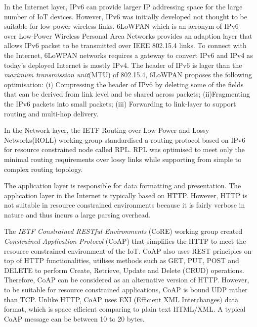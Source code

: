 In the Internet layer, IPv6 can provide larger IP addressing space for the large number of IoT devices. 
However, IPv6 was initially developed not thought to be suitable for low-power wireless links.
6LoWPAN which is an acronym of IPv6 over Low-Power Wireless Personal Area Networks provides an adaption layer that allows IPv6 packet to be transmitted over IEEE 802.15.4 links.
To connect with the Internet, 6LoWPAN networks requires a gateway to convert IPv6 and IPv4 as today’s deployed Internet is mostly IPv4. 
The header of IPv6 is lager than the \textit{maximum transmission unit}(MTU) of 802.15.4, 6LoWPAN proposes the following optimisation:
(i) Compressing the header of IPv6 by deleting some of the fields that can be derived from link level and be shared across packets;
(ii)Fragmenting the IPv6 packets into small packets;
(iii) Forwarding to link-layer to support routing and multi-hop delivery.

In the Network layer, the IETF Routing over Low Power and Lossy Networks(ROLL) working group standardised a routing protocol based on IPv6 for resource constrained node called RPL.
RPL was optimised to meet only the minimal routing requirements over lossy links while supporting from simple to complex routing topology.


The application layer is responsible for data formatting and presentation.
The application layer in the Internet is typically based on HTTP. 
However, HTTP is not suitable in resource constrained environments because it is fairly verbose in nature and thus incurs a large parsing overhead.


The \textit{IETF Constrained RESTful Environments} (CoRE) working group created \textit{Constrained Application Protocol} (CoAP) that simplifies the HTTP to meet the resource constrained environment of the IoT. 
CoAP also uses REST principles on top of HTTP functionalities, utilises methods such as GET, PUT, POST and DELETE to perform Create, Retrieve, Update and Delete (CRUD) operations.
Therefore, CoAP can be considered as an alternative version of HTTP.
However, to be suitable for resource constrained applications, CoAP is bound UDP rather than TCP.
Unlike HTTP, CoAP uses  EXI (Efficient XML Interchanges) data format, which is space efficient comparing to plain text HTML/XML.
A typical CoAP message can be between 10 to 20 bytes.



